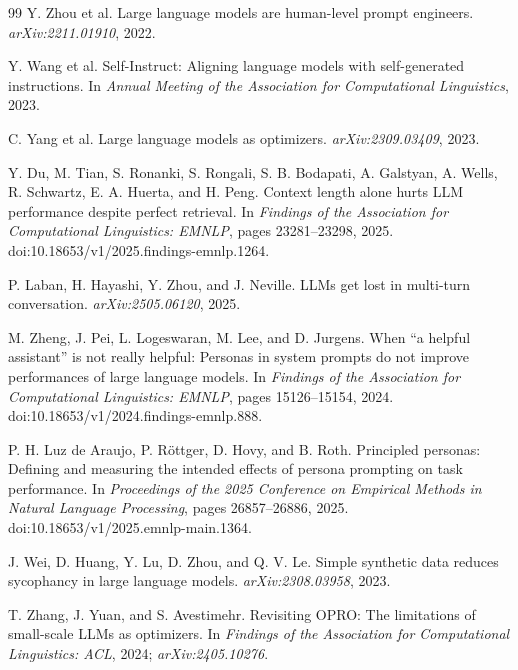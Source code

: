 \documentclass[11pt,a4paper]{article}
\begin{document}
\begin{thebibliography}{99}
Y. Zhou et al.
\newblock Large language models are human-level prompt engineers.
\newblock \emph{arXiv:2211.01910}, 2022.

Y. Wang et al.
\newblock Self-Instruct: Aligning language models with self-generated instructions.
\newblock In \emph{Annual Meeting of the Association for Computational Linguistics}, 2023.

C. Yang et al.
\newblock Large language models as optimizers.
\newblock \emph{arXiv:2309.03409}, 2023.

Y. Du, M. Tian, S. Ronanki, S. Rongali, S. B. Bodapati, A. Galstyan, A. Wells, R. Schwartz, E. A. Huerta, and H. Peng.
\newblock Context length alone hurts LLM performance despite perfect retrieval.
\newblock In \emph{Findings of the Association for Computational Linguistics: EMNLP}, pages 23281--23298, 2025.
\newblock doi:10.18653/v1/2025.findings-emnlp.1264.

P. Laban, H. Hayashi, Y. Zhou, and J. Neville.
\newblock LLMs get lost in multi-turn conversation.
\newblock \emph{arXiv:2505.06120}, 2025.

M. Zheng, J. Pei, L. Logeswaran, M. Lee, and D. Jurgens.
\newblock When ``a helpful assistant'' is not really helpful: Personas in system prompts do not improve performances of large language models.
\newblock In \emph{Findings of the Association for Computational Linguistics: EMNLP}, pages 15126--15154, 2024.
\newblock doi:10.18653/v1/2024.findings-emnlp.888.

P. H. Luz de Araujo, P. R\"ottger, D. Hovy, and B. Roth.
\newblock Principled personas: Defining and measuring the intended effects of persona prompting on task performance.
\newblock In \emph{Proceedings of the 2025 Conference on Empirical Methods in Natural Language Processing}, pages 26857--26886, 2025.
\newblock doi:10.18653/v1/2025.emnlp-main.1364.

J. Wei, D. Huang, Y. Lu, D. Zhou, and Q. V. Le.
\newblock Simple synthetic data reduces sycophancy in large language models.
\newblock \emph{arXiv:2308.03958}, 2023.

T. Zhang, J. Yuan, and S. Avestimehr.
\newblock Revisiting OPRO: The limitations of small-scale LLMs as optimizers.
\newblock In \emph{Findings of the Association for Computational Linguistics: ACL}, 2024; \emph{arXiv:2405.10276}.


\end{thebibliography}
\end{document}
